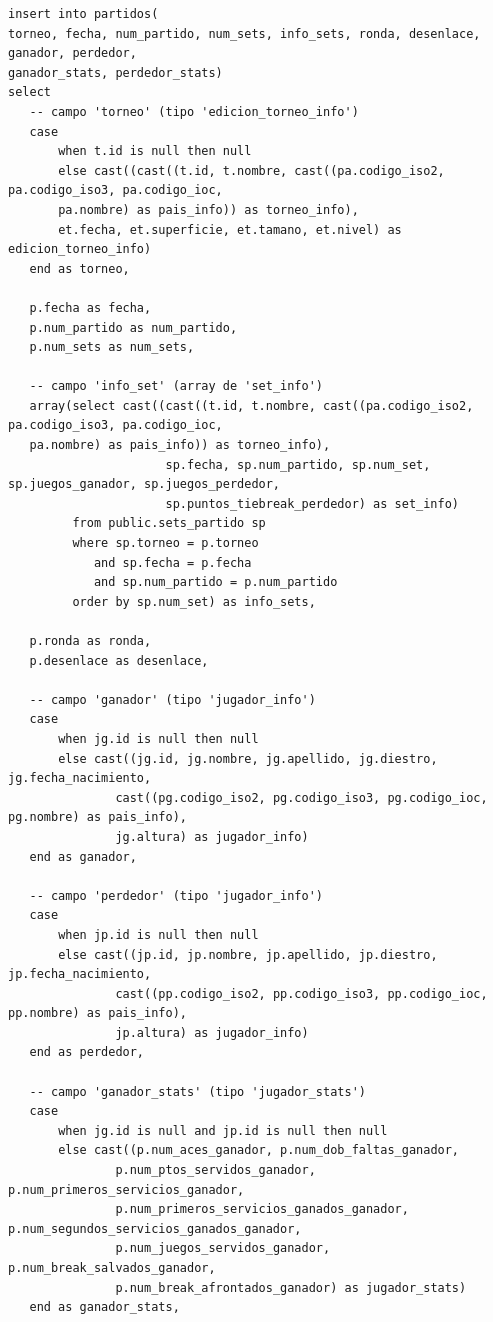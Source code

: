 \begin{verbatim}
insert into partidos(
torneo, fecha, num_partido, num_sets, info_sets, ronda, desenlace, ganador, perdedor, 
ganador_stats, perdedor_stats)
select
   -- campo 'torneo' (tipo 'edicion_torneo_info')
   case
       when t.id is null then null
       else cast((cast((t.id, t.nombre, cast((pa.codigo_iso2, pa.codigo_iso3, pa.codigo_ioc, 
	   pa.nombre) as pais_info)) as torneo_info), 
       et.fecha, et.superficie, et.tamano, et.nivel) as edicion_torneo_info)
   end as torneo,
  
   p.fecha as fecha,
   p.num_partido as num_partido,
   p.num_sets as num_sets,
  
   -- campo 'info_set' (array de 'set_info')
   array(select cast((cast((t.id, t.nombre, cast((pa.codigo_iso2, pa.codigo_iso3, pa.codigo_ioc, 
   pa.nombre) as pais_info)) as torneo_info),
                      sp.fecha, sp.num_partido, sp.num_set, sp.juegos_ganador, sp.juegos_perdedor, 
					  sp.puntos_tiebreak_perdedor) as set_info)
         from public.sets_partido sp
         where sp.torneo = p.torneo
         	and sp.fecha = p.fecha
         	and sp.num_partido = p.num_partido
         order by sp.num_set) as info_sets,
  
   p.ronda as ronda,
   p.desenlace as desenlace,
  
   -- campo 'ganador' (tipo 'jugador_info')
   case
       when jg.id is null then null
       else cast((jg.id, jg.nombre, jg.apellido, jg.diestro, jg.fecha_nacimiento,
       		   cast((pg.codigo_iso2, pg.codigo_iso3, pg.codigo_ioc, pg.nombre) as pais_info),
       		   jg.altura) as jugador_info)
   end as ganador,
  
   -- campo 'perdedor' (tipo 'jugador_info')
   case
       when jp.id is null then null
       else cast((jp.id, jp.nombre, jp.apellido, jp.diestro, jp.fecha_nacimiento,
       		   cast((pp.codigo_iso2, pp.codigo_iso3, pp.codigo_ioc, pp.nombre) as pais_info),
       		   jp.altura) as jugador_info)
   end as perdedor,
  
   -- campo 'ganador_stats' (tipo 'jugador_stats')
   case
       when jg.id is null and jp.id is null then null
       else cast((p.num_aces_ganador, p.num_dob_faltas_ganador,
           	   p.num_ptos_servidos_ganador, p.num_primeros_servicios_ganador,
           	   p.num_primeros_servicios_ganados_ganador, p.num_segundos_servicios_ganados_ganador,
           	   p.num_juegos_servidos_ganador, p.num_break_salvados_ganador,
           	   p.num_break_afrontados_ganador) as jugador_stats)
   end as ganador_stats,
  

\end{verbatim}

